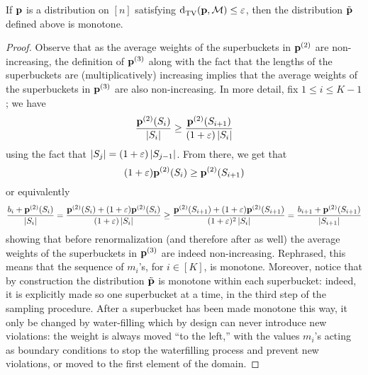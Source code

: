 \begin{lemma}\label{lemma:correct:waterfill:monotone}
If $\mathbf{p}$ is a distribution on $[n]$ satisfying ${\operatorname{d}_{\textrm{TV}}^{}\!\left({\mathbf{p}, \mathcal{M}}\right)} \leq \varepsilon$, then the distribution $\tilde{\mathbf{p}}$ defined above is monotone.
\end{lemma}
\begin{proof}
Observe that as the average weights of the superbuckets in $\mathbf{p}^{(2)}$ are non-increasing, the definition of $\mathbf{p}^{(3)}$ along with the fact that the lengths of the superbuckets are (multiplicatively) increasing implies that the average weights of the superbuckets in $\mathbf{p}^{(3)}$ are also non-increasing. In more detail, fix $1\leq i \leq K-1$; we have
\[
  \frac{\mathbf{p}^{(2)}(S_{i})}{\left\lvert S_i \right\rvert} \geq \frac{\mathbf{p}^{(2)}(S_{i+1})}{(1+\varepsilon)\left\lvert S_i \right\rvert}
\]
using the fact that $\left\lvert S_j \right\rvert = (1+\varepsilon) \left\lvert S_{j-1} \right\rvert$. From there, we get that 
\[
(1+\varepsilon)\mathbf{p}^{(2)}(S_i) \geq \mathbf{p}^{(2)}(S_{i+1})
\] or equivalently 
\[
\frac{b_{i}+\mathbf{p}^{(2)}(S_{i})}{\left\lvert S_{i} \right\rvert} = \frac{\mathbf{p}^{(2)}(S_{i})+(1+\varepsilon)\mathbf{p}^{(2)}(S_{i})}{(1+\varepsilon)\left\lvert S_{i} \right\rvert} \geq 
\frac{\mathbf{p}^{(2)}(S_{i+1})+(1+\varepsilon)\mathbf{p}^{(2)}(S_{i+1})}{(1+\varepsilon)^2\left\lvert S_{i} \right\rvert} =\frac{b_{i+1}+\mathbf{p}^{(2)}(S_{i+1})}{\left\lvert S_{i+1} \right\rvert}
\]
showing that before renormalization (and therefore after as well) the average weights of the superbuckets in $\mathbf{p}^{(3)}$ are indeed non-increasing. Rephrased, this means that the sequence of $m_i$'s, for $i\in[K]$, is monotone. 
Moreover, notice that by construction the distribution $\tilde{\mathbf{p}}$ is monotone within each superbucket: indeed, it is explicitly made so one superbucket at a time, in the third step of the sampling procedure. After a superbucket has been made monotone this way, it only be changed by water-filling which by design can never introduce new violations: the weight is always moved ``to the left,'' with the values $m_i$'s acting as boundary conditions to stop the waterfilling process and prevent new violations, or moved to the first element of the domain.


\end{proof}
